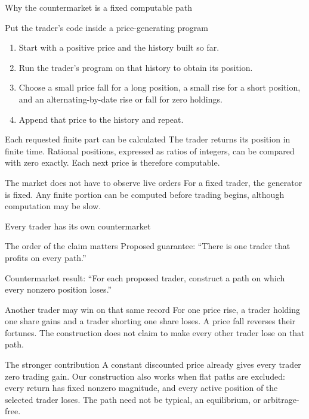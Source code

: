 \documentclass{beamer}
\begin{document}
\begin{frame}{Why the countermarket is a fixed computable path}
\small
\begin{block}{Put the trader's code inside a price-generating program}
\begin{enumerate}
\setlength{\itemsep}{0.45em}
\item Start with a positive price and the history built so far.
\item Run the trader's program on that history to obtain its position.
\item Choose a small price fall for a long position, a small rise for a
short position, and an alternating-by-date rise or fall for zero holdings.
\item Append that price to the history and repeat.
\end{enumerate}
\end{block}
\begin{exampleblock}{Each requested finite part can be calculated}
The trader returns its position in finite time. Rational positions, expressed
as ratios of integers, can be compared with zero exactly. Each next price is therefore
computable.
\end{exampleblock}
\begin{alertblock}{The market does not have to observe live orders}
For a fixed trader, the generator is fixed. Any finite portion can be
computed before trading begins, although computation may be slow.
\end{alertblock}
\end{frame}

\begin{frame}{Every trader has its own countermarket}
\small
\begin{block}{The order of the claim matters}
Proposed guarantee: \enquote{There is one trader that profits on every path.}
\par\medskip
Countermarket result: \enquote{For each proposed trader, construct a path
on which every nonzero position loses.}
\end{block}
\begin{exampleblock}{Another trader may win on that same record}
For one price rise, a trader holding one share gains and a trader shorting
one share loses. A price fall reverses their fortunes.
The construction does not claim to make every other trader lose on that path.
\end{exampleblock}
\begin{alertblock}{The stronger contribution}
A constant discounted price already gives every trader zero trading gain.
Our construction also works when flat paths are excluded: every return
has fixed nonzero magnitude, and every active position of the selected
trader loses. The path need not be typical, an equilibrium, or arbitrage-free.
\end{alertblock}
\end{frame}
\end{document}
